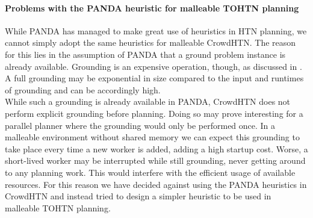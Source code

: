 \paragraph{Problems with the PANDA heuristic for malleable TOHTN planning}
While PANDA has managed to make great use of heuristics in HTN planning, we cannot simply adopt the same heuristics for malleable CrowdHTN. The reason for this lies in the assumption of PANDA that a ground problem instance is already available. Grounding is an expensive operation, though, as discussed in \cite{behnke2020succinct}. A full grounding may be exponential in size compared to the input and runtimes of grounding and can be accordingly high. \\
While such a grounding is already available in PANDA, CrowdHTN does not perform explicit grounding before planning. Doing so may prove interesting for a parallel planner where the grounding would only be performed once. In a malleable environment without shared memory we can expect this grounding to take place every time a new worker is added, adding a high startup cost. Worse, a short-lived worker may be interrupted while still grounding, never getting around to any planning work. This would interfere with the efficient usage of available resources. For this reason we have decided against using the PANDA heuristics in CrowdHTN and instead tried to design a simpler heuristic to be used in malleable TOHTN planning.
\begin{comment}
- PANDA and its heuristics are great
- however, this imposes a startup cost
- implicitly assume a fully grounded instance (up to exponential size!)
- depending on instance grounding can take multiple minutes! (even for the efficient PANDA grounder up to 40 seconds)
- we perform this work multiple times, especially in a malleable environment
\end{comment}
